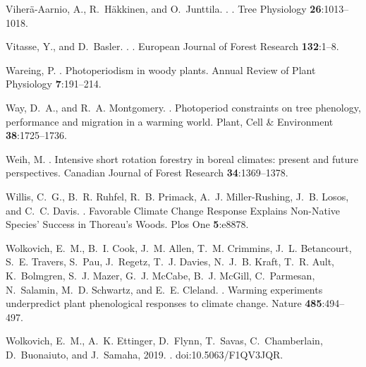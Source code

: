 \documentclass{article}
\begin{document}
\begin{thebibliography}{131}
Viher{\"a}-Aarnio, A., R.~H{\"a}kkinen, and O.~Junttila.
.
.
\newblock Tree Physiology {\bf 26}:1013--1018.

Vitasse, Y., and D.~Basler.
.
.
\newblock European Journal of Forest Research {\bf 132}:1--8.

Wareing, P.
.
\newblock Photoperiodism in woody plants.
\newblock Annual Review of Plant Physiology {\bf 7}:191--214.

Way, D.~A., and R.~A. Montgomery.
.
\newblock Photoperiod constraints on tree phenology, performance and migration
  in a warming world.
\newblock Plant, Cell \& Environment {\bf 38}:1725--1736.

Weih, M.
.
\newblock Intensive short rotation forestry in boreal climates: present and
  future perspectives.
\newblock Canadian Journal of Forest Research {\bf 34}:1369--1378.

Willis, C.~G., B.~R. Ruhfel, R.~B. Primack, A.~J. Miller-Rushing, J.~B. Losos,
  and C.~C. Davis.
.
\newblock Favorable Climate Change Response Explains Non-Native Species'
  Success in {T}horeau's Woods.
\newblock Plos One {\bf 5}:e8878.

Wolkovich, E.~M., B.~I. Cook, J.~M. Allen, T.~M. Crimmins, J.~L. Betancourt,
  S.~E. Travers, S.~Pau, J.~Regetz, T.~J. Davies, N.~J.~B. Kraft, T.~R. Ault,
  K.~Bolmgren, S.~J. Mazer, G.~J. McCabe, B.~J. McGill, C.~Parmesan,
  N.~Salamin, M.~D. Schwartz, and E.~E. Cleland.
.
\newblock Warming experiments underpredict plant phenological responses to
  climate change.
\newblock Nature {\bf 485}:494--497.

Wolkovich, E.~M., A.~K. Ettinger, D.~Flynn, T.~Savas, C.~Chamberlain,
  D.~Buonaiuto, and J.~Samaha, 2019.
.
\newblock doi:10.5063/F1QV3JQR.


\end{thebibliography}
\end{document}
